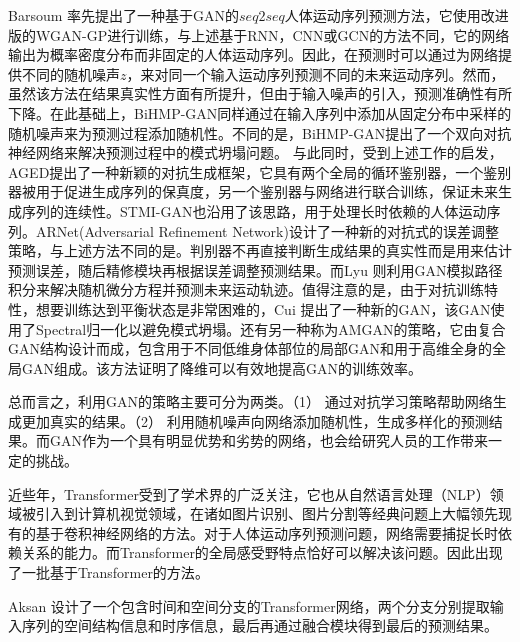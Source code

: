 Barsoum \etal \parencite{barsoum2018hp}率先提出了一种基于GAN的$seq2seq$人体运动序列预测方法，它使用改进版的WGAN-GP进行训练，与上述基于RNN，CNN或GCN的方法不同，它的网络输出为概率密度分布而非固定的人体运动序列。因此，在预测时可以通过为网络提供不同的随机噪声$z$，来对同一个输入运动序列预测不同的未来运动序列。然而，虽然该方法在结果真实性方面有所提升，但由于输入噪声的引入，预测准确性有所下降。在此基础上，BiHMP-GAN\parencite{kundu2019bihmp}同样通过在输入序列中添加从固定分布中采样的随机噪声来为预测过程添加随机性。不同的是，BiHMP-GAN提出了一个双向对抗神经网络来解决预测过程中的模式坍塌问题。
与此同时，受到上述工作的启发，AGED\parencite{gui2018adversarial}提出了一种新颖的对抗生成框架，它具有两个全局的循环鉴别器，一个鉴别器被用于促进生成序列的保真度，另一个鉴别器与网络进行联合训练，保证未来生成序列的连续性。STMI-GAN\parencite{hernandez2019human}也沿用了该思路，用于处理长时依赖的人体运动序列。ARNet(Adversarial Refinement Network)\parencite{chao2020adversarial}设计了一种新的对抗式的误差调整策略，与上述方法不同的是。判别器不再直接判断生成结果的真实性而是用来估计预测误差，随后精修模块再根据误差调整预测结果。而Lyu \etal \parencite{lyu2021learning}则利用GAN模拟路径积分来解决随机微分方程并预测未来运动轨迹。值得注意的是，由于对抗训练特性，想要训练达到平衡状态是非常困难的，Cui \etal\parencite{cui2021efficient}提出了一种新的GAN，该GAN使用了Spectral归一化以避免模式坍塌。还有另一种称为AMGAN\parencite{liu2021aggregated}的策略，它由复合GAN结构设计而成，包含用于不同低维身体部位的局部GAN和用于高维全身的全局GAN组成。该方法证明了降维可以有效地提高GAN的训练效率。

总而言之，利用GAN的策略主要可分为两类。（1） 通过对抗学习策略帮助网络生成更加真实的结果。（2） 利用随机噪声向网络添加随机性，生成多样化的预测结果。而GAN作为一个具有明显优势和劣势的网络，也会给研究人员的工作带来一定的挑战。


近些年，Transformer受到了学术界的广泛关注，它也从自然语言处理（NLP）领域被引入到计算机视觉领域，在诸如图片识别、图片分割等经典问题上大幅领先现有的基于卷积神经网络的方法。对于人体运动序列预测问题，网络需要捕捉长时依赖关系的能力。而Transformer的全局感受野特点恰好可以解决该问题。因此出现了一批基于Transformer的方法\parencite{aksan2021spatio, cai2020learning}。

Aksan \etal \parencite{aksan2021spatio}设计了一个包含时间和空间分支的Transformer网络，两个分支分别提取输入序列的空间结构信息和时序信息，最后再通过融合模块得到最后的预测结果。


